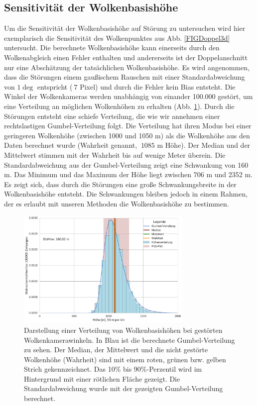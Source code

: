 \documentclass[a4paper,11pt,twoside,german]{article}
\newcommand{\absatz}{\smallbreak}
\begin{document}
\subsection{Sensitivität der Wolkenbasishöhe}
\label{SECSens}
Um die Sensitivität der Wolkenbasishöhe auf Störung zu untersuchen wird hier exemplarisch die Sensitivität des Wolkenpunktes aus Abb. \ref{FIGDoppel3d} untersucht.\absatz
Die berechnete Wolkenbasishöhe kann einerseits durch den Wolkenabgleich einen Fehler enthalten und andererseits ist der Doppelanschnitt nur eine Abschätzung der tatsächlichen Wolkenbasishöhe. Es wird angenommen, dass die Störungen einem gaußischem Rauschen mit einer Standardabweichung von $1\deg$ entspricht ($~7$ Pixel) und durch die Fehler kein Bias entsteht. Die Winkel der Wolkenkameras werden unabhängig von einander 100.000 gestört, um eine Verteilung an möglichen Wolkenhöhen zu erhalten (Abb. \ref{FIGSens}).\absatz
Durch die Störungen entsteht eine schiefe Verteilung, die wie wir annehmen einer rechtslastigen Gumbel-Verteilung folgt. Die Verteilung hat ihren Modus bei einer geringeren Wolkenhöhe (zwischen 1000 und 1050 m) als die Wolkenhöhe aus den Daten berechnet wurde (Wahrheit genannt, $~1085$ m Höhe). Der Median und der Mittelwert stimmen mit der Wahrheit bis auf wenige Meter überein. Die Standardabweichung aus der Gumbel-Verteilung zeigt eine Schwankung von 160 m. Das Minimum und das Maximum der Höhe liegt zwischen 706 m und 2352 m.\absatz
Es zeigt sich, dass durch die Störungen eine große Schwankungsbreite in der Wolkenbasishöhe entsteht. Die Schwankungen bleiben jedoch in einem Rahmen, der es erlaubt mit unseren Methoden die Wolkenbasishöhe zu bestimmen.
\clearpage
\begin{figure}[h]
	\begin{center}
		\includegraphics[width=0.75\textwidth]{media/sens_prob_height.pdf}
		\caption[Wolkenhöhenverteilung von gestörten Wolkenkamerawinkeln]{Darstellung einer Verteilung von Wolkenbasishöhen bei gestörten Wolkenkamerawinkeln. In Blau ist die berechnete Gumbel-Verteilung zu sehen. Der Median, der Mittelwert und die nicht gestörte Wolkenhöhe (Wahrheit) sind mit einem roten, grünen bzw. gelben Strich gekennzeichnet. Das 10\% bis 90\%-Perzentil wird im Hintergrund mit einer rötlichen Fläche gezeigt. Die Standardabweichung wurde mit der gezeigten Gumbel-Verteilung berechnet.}
		\label{FIGSens}
	\end{center}
\end{figure}
\end{document}
